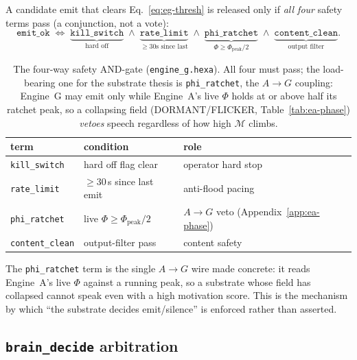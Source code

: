 A candidate emit that clears Eq.~\eqref{eq:eg-thresh} is released only if
\emph{all four} safety terms pass (a conjunction, not a vote):
\begin{equation}
\texttt{emit\_ok}
\;\iff\;
\underbrace{\texttt{kill\_switch}}_{\text{hard off}}
\;\wedge\;
\underbrace{\texttt{rate\_limit}}_{\ge 30\text{s since last}}
\;\wedge\;
\underbrace{\texttt{phi\_ratchet}}_{\Phi \ge \Phi_\text{peak}/2}
\;\wedge\;
\underbrace{\texttt{content\_clean}}_{\text{output filter}} .
\label{eq:eg-safety}
\end{equation}
\begin{table}[h]
\centering
\small
\setlength{\tabcolsep}{6pt}
\begin{tabular}{@{}l l l@{}}
\toprule
\textbf{term} & \textbf{condition} & \textbf{role} \\
\midrule
\texttt{kill\_switch}   & hard off flag clear            & operator hard stop \\
\texttt{rate\_limit}    & $\ge 30$\,s since last emit     & anti-flood pacing \\
\texttt{phi\_ratchet}   & live $\Phi \ge \Phi_\text{peak}/2$ & $A\!\rightarrow\!G$ veto (Appendix~\ref{app:ea-phase}) \\
\texttt{content\_clean} & output-filter pass             & content safety \\
\bottomrule
\end{tabular}
\caption{The four-way safety AND-gate (\texttt{engine\_g.hexa}). All four must
pass; the load-bearing one for the substrate thesis is \texttt{phi\_ratchet},
the $A\!\rightarrow\!G$ coupling: Engine~G may emit only while Engine~A's live
$\Phi$ holds at or above half its ratchet peak, so a collapsing field
(DORMANT/FLICKER, Table~\ref{tab:ea-phase}) \emph{vetoes} speech regardless of how
high $\mathcal{M}$ climbs.}
\label{tab:eg-safety}
\end{table}

The \texttt{phi\_ratchet} term is the single $A\!\rightarrow\!G$ wire made
concrete: it reads Engine~A's live $\Phi$ against a running peak, so a substrate
whose field has collapsed cannot speak even with a high motivation score. This is
the mechanism by which ``the substrate decides emit/silence'' is enforced rather
than asserted.

\subsection{\texttt{brain\_decide} arbitration}
\label{app:eg-brain}

